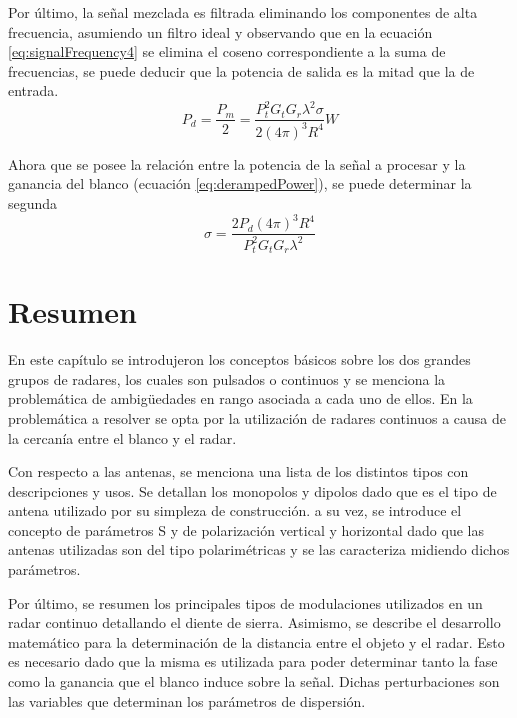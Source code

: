 Por último, la señal mezclada es filtrada eliminando los componentes de alta frecuencia, asumiendo un filtro ideal y observando que en la ecuación \ref{eq:signalFrequency4} se elimina el coseno correspondiente a la suma de frecuencias, se puede deducir que la potencia de salida es la mitad que la de entrada.
\begin{equation} \label{eq:derampedPower}
  P_d = \dfrac{P_m}{2} = \dfrac{P_t^2G_tG_r\lambda^2\sigma}{2(4\pi)^3 R^4} W
\end{equation}

Ahora que se posee la relación entre la potencia de la señal a procesar y la ganancia del blanco (ecuación \ref{eq:derampedPower}), se puede determinar la segunda
\begin{equation}
  \sigma = \dfrac{2P_d(4\pi)^3 R^4}{P_t^2G_tG_r\lambda^2}
\end{equation}


\section{Resumen}

En este capítulo se introdujeron los conceptos básicos sobre los dos grandes grupos de radares, los cuales son pulsados o continuos y se menciona la problemática de ambigüedades en rango asociada a cada uno de ellos. En la problemática a resolver se opta por la utilización de radares continuos a causa de la cercanía entre el blanco y el radar.

Con respecto a las antenas, se menciona una lista de los distintos tipos con descripciones y usos. Se detallan los monopolos y dipolos dado que es el tipo de antena utilizado por su simpleza de construcción. a su vez, se introduce el concepto de parámetros S y de polarización vertical y horizontal dado que las antenas utilizadas son del tipo polarimétricas y se las caracteriza midiendo dichos parámetros.

Por último, se resumen los principales tipos de modulaciones utilizados en un radar continuo detallando el diente de sierra. Asimismo, se describe el desarrollo matemático para la determinación de la distancia entre el objeto y el radar. Esto es necesario dado que la misma es utilizada para poder determinar tanto la fase como la ganancia que el blanco induce sobre la señal. Dichas perturbaciones son las variables que determinan los parámetros de dispersión.

